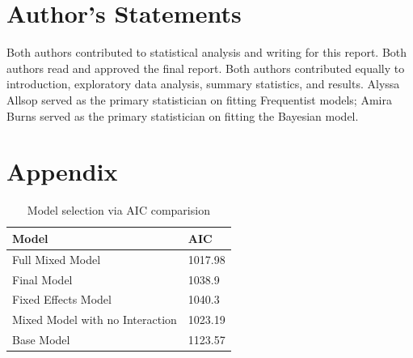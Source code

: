 \documentclass[12pt]{article}
\begin{document}
\section{Author's Statements}
\label{sec:auth}

Both authors contributed to statistical analysis and writing for this report. Both authors read and approved the final report. Both authors contributed equally to introduction, exploratory data analysis, summary statistics, and results. Alyssa Allsop served as the primary statistician on fitting Frequentist models; Amira Burns served as the primary statistician on fitting the Bayesian model.

\section{Appendix}
\label{sec:appendix}  
\begin{table}[!h]
\centering
\begin{tabu} to 
  \toprule
Model & AIC \\ 
  \midrule
Full Mixed Model & 1017.98 \\ 
  Final Model & 1038.9 \\ 
  Fixed Effects Model & 1040.3 \\ 
  Mixed Model with no Interaction & 1023.19 \\ 
  Base Model & 1123.57 \\ 
   \bottomrule
\end{tabu}
\caption{Model selection via AIC comparision} 
\end{table}



\end{document}
